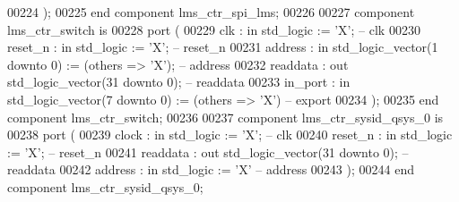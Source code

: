 \begin{DoxyCode}
00224         );
00225     \textcolor{keywordflow}{end} \textcolor{keywordflow}{component} \textcolor{vhdlchar}{lms_ctr_spi_lms};
00226 
00227     \textcolor{keywordflow}{component} lms\_ctr\_switch \textcolor{keywordflow}{is}
00228         \textcolor{keywordflow}{port} (
00229             clk      : \textcolor{keywordflow}{in}  \textcolor{comment}{std\_logic}                     := 'X';             \textcolor{keyword}{-- clk}
00230             reset\_n  : \textcolor{keywordflow}{in}  \textcolor{comment}{std\_logic}                     := 'X';             \textcolor{keyword}{-- reset\_n}
00231             address  : \textcolor{keywordflow}{in}  \textcolor{comment}{std\_logic\_vector}(\textcolor{vhdllogic}{}\textcolor{vhdllogic}{1} \textcolor{keywordflow}{downto} \textcolor{vhdllogic}{}\textcolor{vhdllogic}{0})  := (\textcolor{keywordflow}{others} => 'X'); \textcolor{keyword}{-- address}
00232             readdata : \textcolor{keywordflow}{out} \textcolor{comment}{std\_logic\_vector}(\textcolor{vhdllogic}{}\textcolor{vhdllogic}{31} \textcolor{keywordflow}{downto} \textcolor{vhdllogic}{}\textcolor{vhdllogic}{0});                    \textcolor{keyword}{-- readdata}
00233             in\_port  : \textcolor{keywordflow}{in}  \textcolor{comment}{std\_logic\_vector}(\textcolor{vhdllogic}{}\textcolor{vhdllogic}{7} \textcolor{keywordflow}{downto} \textcolor{vhdllogic}{}\textcolor{vhdllogic}{0})  := (\textcolor{keywordflow}{others} => 'X')\textcolor{keyword}{  -- export}
00234         );
00235     \textcolor{keywordflow}{end} \textcolor{keywordflow}{component} \textcolor{vhdlchar}{lms_ctr_switch};
00236 
00237     \textcolor{keywordflow}{component} lms\_ctr\_sysid\_qsys\_0 \textcolor{keywordflow}{is}
00238         \textcolor{keywordflow}{port} (
00239             clock    : \textcolor{keywordflow}{in}  \textcolor{comment}{std\_logic}                     := 'X'; \textcolor{keyword}{-- clk}
00240             reset\_n  : \textcolor{keywordflow}{in}  \textcolor{comment}{std\_logic}                     := 'X'; \textcolor{keyword}{-- reset\_n}
00241             readdata : \textcolor{keywordflow}{out} \textcolor{comment}{std\_logic\_vector}(\textcolor{vhdllogic}{}\textcolor{vhdllogic}{31} \textcolor{keywordflow}{downto} \textcolor{vhdllogic}{}\textcolor{vhdllogic}{0});        \textcolor{keyword}{-- readdata}
00242             address  : \textcolor{keywordflow}{in}  \textcolor{comment}{std\_logic}                     := 'X'  \textcolor{keyword}{-- address}
00243         );
00244     \textcolor{keywordflow}{end} \textcolor{keywordflow}{component} \textcolor{vhdlchar}{lms_ctr_sysid_qsys_0};

\end{DoxyCode}
